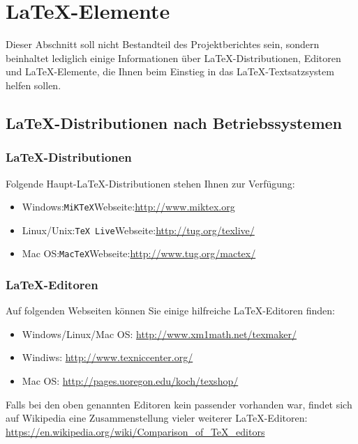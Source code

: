 \documentclass[12pt,a4paper,bibliography=totocnumbered,listof=totocnumbered]{scrartcl}
\begin{document}
    \section{\LaTeX-Elemente}
    Dieser Abschnitt soll nicht Bestandteil des Projektberichtes sein, sondern beinhaltet lediglich einige Informationen über \LaTeX-Distributionen, Editoren und \LaTeX-Elemente, die Ihnen beim Einstieg in das \LaTeX-Textsatzsystem helfen sollen.

    \subsection{\LaTeX-Distributionen nach Betriebssystemen}

    \subsubsection{\LaTeX-Distributionen}
    Folgende Haupt-\LaTeX-Distributionen stehen Ihnen zur Verfügung:
    \begin{itemize}
        \item Windows:\quad \texttt{MiKTeX}\quad Webseite:\quad\url{http://www.miktex.org}
        \item Linux/Unix:\quad \texttt{TeX Live}\quad Webseite:\quad\url{http://tug.org/texlive/}
        \item Mac OS:\quad \texttt{MacTeX}\quad Webseite:\quad\url{http://www.tug.org/mactex/}
    \end{itemize}

    \subsubsection{\LaTeX-Editoren}
    Auf folgenden Webseiten können Sie einige hilfreiche \LaTeX-Editoren finden:
    \begin{itemize}
        \item Windows/Linux/Mac OS: \url{http://www.xm1math.net/texmaker/}
        \item Windiws: \url{http://www.texniccenter.org/}
        \item Mac OS: \url{http://pages.uoregon.edu/koch/texshop/}
    \end{itemize}

    Falls bei den oben genannten Editoren kein passender vorhanden war, findet sich auf Wikipedia eine Zusammenstellung vieler weiterer \LaTeX-Editoren:\\[1em]
    \hspace*{3cm}\url{https://en.wikipedia.org/wiki/Comparison_of_TeX_editors}
\end{document}
